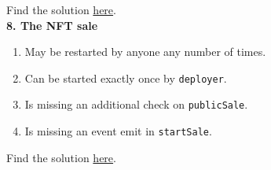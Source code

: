 Find the solution \hyperref[sec:exam8_q7]{here}.\\

\textbf{8. The NFT sale}

\begin{enumerate}[label=\Alph*.]
    \item May be restarted by anyone any number of times.
    \item Can be started exactly once by \verb|deployer|.
    \item Is missing an additional check on \verb|publicSale|.
    \item Is missing an event emit in \verb|startSale|.
\end{enumerate}

Find the solution \hyperref[sec:exam8_q8]{here}.\\